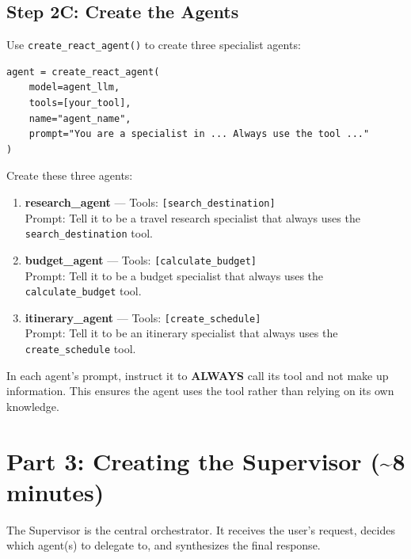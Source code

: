 \documentclass[11pt, letterpaper]{article}
\begin{document}
\subsection*{Step 2C: Create the Agents}

Use \texttt{create\_react\_agent()} to create three specialist agents:

\begin{lstlisting}
agent = create_react_agent(
    model=agent_llm,
    tools=[your_tool],
    name="agent_name",
    prompt="You are a specialist in ... Always use the tool ..."
)
\end{lstlisting}

\noindent Create these three agents:

\begin{enumerate}
  \item \textbf{research\_agent} --- Tools: \texttt{[search\_destination]}\\
    Prompt: Tell it to be a travel research specialist that always uses the \texttt{search\_destination} tool.

  \item \textbf{budget\_agent} --- Tools: \texttt{[calculate\_budget]}\\
    Prompt: Tell it to be a budget specialist that always uses the \texttt{calculate\_budget} tool.

  \item \textbf{itinerary\_agent} --- Tools: \texttt{[create\_schedule]}\\
    Prompt: Tell it to be an itinerary specialist that always uses the \texttt{create\_schedule} tool.
\end{enumerate}

\begin{importantbox}
In each agent's prompt, instruct it to \textbf{ALWAYS} call its tool and not make up information. This ensures the agent uses the tool rather than relying on its own knowledge.
\end{importantbox}


\section{Part 3: Creating the Supervisor \textnormal{(\textasciitilde8 minutes)}}

The Supervisor is the central orchestrator. It receives the user's request, decides which agent(s) to delegate to, and synthesizes the final response.
\end{document}

